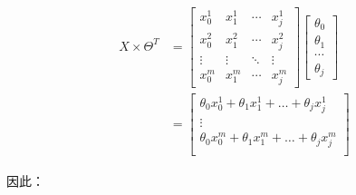 \documentclass[12pt, a4paper]{article}
\begin{document}
\begin{enumerate}
          \begin{align*}
              X \times \Theta^T & =
              \begin{bmatrix}
                  x_0^1  & x_1^1  & \cdots & x_j^1  \\
                  x_0^2  & x_1^2  & \cdots & x_j^2  \\
                  \vdots & \vdots & \ddots & \vdots \\
                  x_0^m  & x_1^m  & \cdots & x_j^m
              \end{bmatrix}
              \begin{bmatrix}
                  \theta_0 \\
                  \theta_1 \\
                  \cdots   \\
                  \theta_j
              \end{bmatrix}
              \\
                                & =
              \begin{bmatrix}
                  \theta_0x_0^1+\theta_1x_1^1+\dots+\theta_jx_j^1 \\
                  \vdots                                          \\
                  \theta_0x_0^m+\theta_1x_1^m+\dots+\theta_jx_j^m \\
              \end{bmatrix}
          \end{align*}

          因此：


\end{enumerate}
\end{document}
